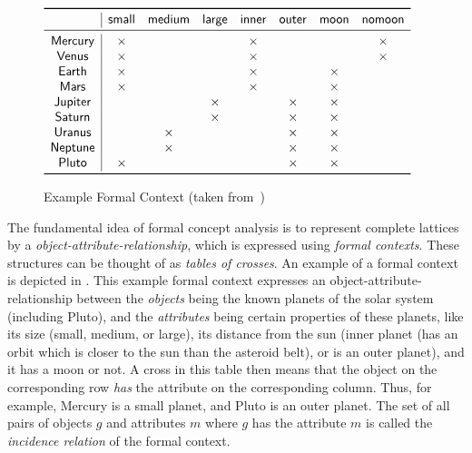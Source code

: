 \begin{figure}[tp]
  \centering
  \begin{math}
    \begin{array}[c]{c|*{7}{c}}
      \toprule
      ~       & \mathsf{small} & \mathsf{medium} & \mathsf{large} & \mathsf{inner} &
      \mathsf{outer} & \mathsf{moon} & \mathsf{no moon} \\
      \midrule
      \mathsf{Mercury} & \times &   &   & \times &   &   & \times  \\
      \mathsf{Venus}   & \times &   &   & \times &   &   & \times  \\
      \mathsf{Earth}   & \times &   &   & \times &   & \times &    \\
      \mathsf{Mars}    & \times &   &   & \times &   & \times &    \\
      \mathsf{Jupiter} &   &   & \times &   & \times & \times &    \\
      \mathsf{Saturn}  &   &   & \times &   & \times & \times &    \\
      \mathsf{Uranus}  &   & \times &   &   & \times & \times &    \\
      \mathsf{Neptune} &   & \times &   &   & \times & \times &    \\
      \mathsf{Pluto}   & \times &   &   &   & \times & \times &    \\
      \bottomrule
    \end{array}
  \end{math}
  \caption{Example Formal Context (taken from~\cite{fca:Wille:1982})}
  \label{fig:example-formal-context}
\end{figure}

The fundamental idea of formal concept analysis is to represent complete lattices by a
\emph{object-attribute-relationship}, which is expressed using \emph{formal contexts}.
These structures can be thought of as \emph{tables of crosses}.  An example of a formal
context is depicted in .  This example formal context
expresses an object-attribute-relationship between the \emph{objects} being the known
planets of the solar system (including Pluto), and the \emph{attributes} being certain
properties of these planets, like its size (\textsf{small}, \textsf{medium}, or
\textsf{large}), its distance from the sun (\textsf{inner} planet (\ie has an orbit which
is closer to the sun than the asteroid belt), or is an \textsf{outer} planet), and it has
a \textsf{moon} or not.  A cross in this table then means that the object on the
corresponding row \emph{has} the attribute on the corresponding column.  Thus, for
example, \textsf{Mercury} is a \textsf{small} planet, and \textsf{Pluto} is an
\textsf{outer} planet.  The set of all pairs of objects $g$ and attributes $m$ where $g$
has the attribute $m$ is called the \emph{incidence relation} of the formal context.

